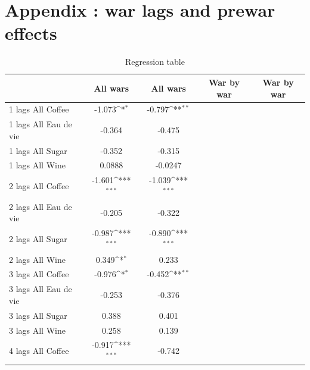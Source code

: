 \documentclass[12pt,a4paper,titlepage]{article}
\begin{document}
\newpage
\appendix
\section{Appendix : war lags and prewar effects}


{
\def\sym#1{\ifmmode^{#1}\else\(^{#1}\)\fi}
\begin{longtable}{l*{4}{c}}
\caption{Regression table\label{tab1}}\\
\toprule\endfirsthead\midrule\endhead\midrule\endfoot\endlastfoot
                    &\multicolumn{1}{c}{All wars}&\multicolumn{1}{c}{All wars}&\multicolumn{1}{c}{War by war}&\multicolumn{1}{c}{War by war}\\
\midrule
1 lags All Coffee   &      -1.073\sym{*}  &      -0.797\sym{**} &                     &                     \\
1 lags All Eau de vie&      -0.364         &      -0.475         &                     &                     \\
1 lags All Sugar    &      -0.352         &      -0.315         &                     &                     \\
1 lags All Wine     &      0.0888         &     -0.0247         &                     &                     \\
2 lags All Coffee   &      -1.601\sym{***}&      -1.039\sym{***}&                     &                     \\
2 lags All Eau de vie&      -0.205         &      -0.322         &                     &                     \\
2 lags All Sugar    &      -0.987\sym{***}&      -0.890\sym{***}&                     &                     \\
2 lags All Wine     &       0.349\sym{*}  &       0.233         &                     &                     \\
3 lags All Coffee   &      -0.976\sym{*}  &      -0.452\sym{**} &                     &                     \\
3 lags All Eau de vie&      -0.253         &      -0.376         &                     &                     \\
3 lags All Sugar    &       0.388         &       0.401         &                     &                     \\
3 lags All Wine     &       0.258         &       0.139         &                     &                     \\
4 lags All Coffee   &      -0.917\sym{***}&      -0.742         &                     &                     \\

\end{longtable}}
\end{document}
